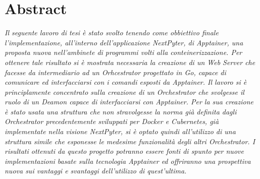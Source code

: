 \chapter*{Abstract}
\thispagestyle{empty}

\textit{Il seguente lavoro di tesi è stato svolto tenendo come obbiettivo finale l'implementazione, all'interno dell'applicazione NextPyter, di Apptainer, una proposta nuova nell'ambinete di programmi volti alla conteinerizzazione. Per ottenere tale risultato si è mostrata necessaria la creazione di un Web Server che facesse da intermediario ad un Orhcestrator progettato in Go, capace di comunicare ed interfacciarsi con i comandi esposti da Apptainer.\newline
Il lavoro si è principlamente concentrato sulla creazione di un Orchestrator che svolgesse il ruolo di un Deamon capace di interfacciarsi con Apptainer. Per la sua creazione è stato usata una struttura che non stravolgesse la norma già definita dagli Orchestrator precedentemente sviluppati per Docker e Cubernetes, già implementate nella visione NextPyter, si è optato quindi all'utilizzo di una struttura simile che esponesse le medesime funzionalità degli altri Orchestrator.\newline
I risultati ottenuti da questo progetto potranno essere fonti di spunto per nuove implementazioni basate sulla tecnologia Apptainer ed offriranno una prospettiva nuova sui vantaggi e svantaggi dell'utilizzo di quest'ultima.
}